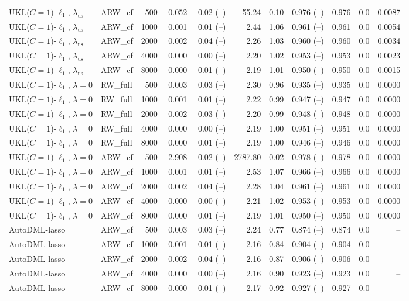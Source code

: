 \begin{tabular}{llrrrrrrrrr}
UKL($C=1$)-$\ell_1$, $\lambda_{\mathrm{us}}$ & ARW\_cf & 500 & -0.052 & -0.02 (--) & 55.24 & 0.10 & 0.976 (--) & 0.976 & 0.0 & 0.0087 \\
UKL($C=1$)-$\ell_1$, $\lambda_{\mathrm{us}}$ & ARW\_cf & 1000 & 0.001 & 0.01 (--) & 2.44 & 1.06 & 0.961 (--) & 0.961 & 0.0 & 0.0054 \\
UKL($C=1$)-$\ell_1$, $\lambda_{\mathrm{us}}$ & ARW\_cf & 2000 & 0.002 & 0.04 (--) & 2.26 & 1.03 & 0.960 (--) & 0.960 & 0.0 & 0.0034 \\
UKL($C=1$)-$\ell_1$, $\lambda_{\mathrm{us}}$ & ARW\_cf & 4000 & 0.000 & 0.00 (--) & 2.20 & 1.02 & 0.953 (--) & 0.953 & 0.0 & 0.0023 \\
UKL($C=1$)-$\ell_1$, $\lambda_{\mathrm{us}}$ & ARW\_cf & 8000 & 0.000 & 0.01 (--) & 2.19 & 1.01 & 0.950 (--) & 0.950 & 0.0 & 0.0015 \\
UKL($C=1$)-$\ell_1$, $\lambda=0$ & RW\_full & 500 & 0.003 & 0.03 (--) & 2.30 & 0.96 & 0.935 (--) & 0.935 & 0.0 & 0.0000 \\
UKL($C=1$)-$\ell_1$, $\lambda=0$ & RW\_full & 1000 & 0.001 & 0.01 (--) & 2.22 & 0.99 & 0.947 (--) & 0.947 & 0.0 & 0.0000 \\
UKL($C=1$)-$\ell_1$, $\lambda=0$ & RW\_full & 2000 & 0.002 & 0.03 (--) & 2.20 & 0.99 & 0.948 (--) & 0.948 & 0.0 & 0.0000 \\
UKL($C=1$)-$\ell_1$, $\lambda=0$ & RW\_full & 4000 & 0.000 & 0.00 (--) & 2.19 & 1.00 & 0.951 (--) & 0.951 & 0.0 & 0.0000 \\
UKL($C=1$)-$\ell_1$, $\lambda=0$ & RW\_full & 8000 & 0.000 & 0.01 (--) & 2.19 & 1.00 & 0.946 (--) & 0.946 & 0.0 & 0.0000 \\
UKL($C=1$)-$\ell_1$, $\lambda=0$ & ARW\_cf & 500 & -2.908 & -0.02 (--) & 2787.80 & 0.02 & 0.978 (--) & 0.978 & 0.0 & 0.0000 \\
UKL($C=1$)-$\ell_1$, $\lambda=0$ & ARW\_cf & 1000 & 0.001 & 0.01 (--) & 2.53 & 1.07 & 0.966 (--) & 0.966 & 0.0 & 0.0000 \\
UKL($C=1$)-$\ell_1$, $\lambda=0$ & ARW\_cf & 2000 & 0.002 & 0.04 (--) & 2.28 & 1.04 & 0.961 (--) & 0.961 & 0.0 & 0.0000 \\
UKL($C=1$)-$\ell_1$, $\lambda=0$ & ARW\_cf & 4000 & 0.000 & 0.00 (--) & 2.21 & 1.02 & 0.953 (--) & 0.953 & 0.0 & 0.0000 \\
UKL($C=1$)-$\ell_1$, $\lambda=0$ & ARW\_cf & 8000 & 0.000 & 0.01 (--) & 2.19 & 1.01 & 0.950 (--) & 0.950 & 0.0 & 0.0000 \\
AutoDML-lasso & ARW\_cf & 500 & 0.003 & 0.03 (--) & 2.24 & 0.77 & 0.874 (--) & 0.874 & 0.0 & -- \\
AutoDML-lasso & ARW\_cf & 1000 & 0.001 & 0.01 (--) & 2.16 & 0.84 & 0.904 (--) & 0.904 & 0.0 & -- \\
AutoDML-lasso & ARW\_cf & 2000 & 0.002 & 0.04 (--) & 2.16 & 0.87 & 0.906 (--) & 0.906 & 0.0 & -- \\
AutoDML-lasso & ARW\_cf & 4000 & 0.000 & 0.00 (--) & 2.16 & 0.90 & 0.923 (--) & 0.923 & 0.0 & -- \\
AutoDML-lasso & ARW\_cf & 8000 & 0.000 & 0.01 (--) & 2.17 & 0.92 & 0.927 (--) & 0.927 & 0.0 & -- \\
\hline
\end{tabular}
